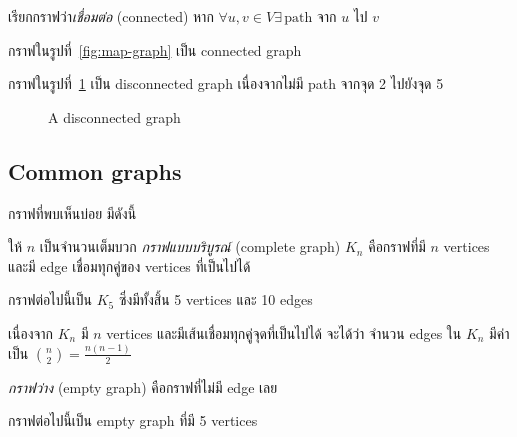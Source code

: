 \begin{definition}
เรียกกราฟว่า\emph{เชื่อมต่อ} (connected) หาก $\forall u,v\in V \exists\,\text{path จาก $u$ ไป $v$}$
\end{definition}
%
\begin{example}
กราฟในรูปที่~\ref{fig:map-graph} เป็น connected graph
\end{example}
%
\begin{example}
กราฟในรูปที่~\ref{fig:disconnected-graph} เป็น disconnected graph เนื่องจากไม่มี path จากจุด 2 ไปยังจุด 5
\begin{figure}
\centering
{}
\caption{A disconnected graph}
\label{fig:disconnected-graph}
\end{figure}
\end{example}

\subsection{Common graphs}

กราฟที่พบเห็นบ่อย มีดังนี้

\begin{definition}
ให้ $n$ เป็นจำนวนเต็มบวก \enskip \emph{กราฟแบบบริบูรณ์} (complete graph) $K_n$ คือกราฟที่มี $n$ vertices และมี edge เชื่อมทุกคู่ของ vertices ที่เป็นไปได้
\end{definition}
%
\begin{example}
กราฟต่อไปนี้เป็น $K_5$ ซึ่งมีทั้งสิ้น 5 vertices และ 10 edges
\begin{center}
\end{center}
\end{example}
เนื่องจาก $K_n$ มี $n$ vertices และมีเส้นเชื่อมทุกคู่จุดที่เป็นไปได้ จะได้ว่า จำนวน edges ใน $K_n$ มีค่าเป็น $\binom{n}{2}=\frac{n(n-1)}{2}$

\begin{definition}
\emph{กราฟว่าง} (empty graph) คือกราฟที่ไม่มี edge เลย
\end{definition}
%
\begin{example}
กราฟต่อไปนี้เป็น empty graph ที่มี 5 vertices
\begin{center}
\end{center}
\end{example}

